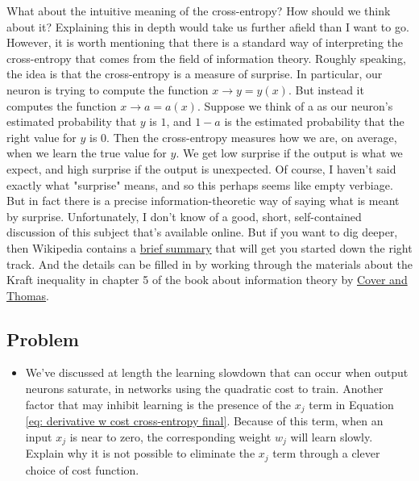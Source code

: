 \documentclass[a4paper,11pt,twoside]{report}
\begin{document}
What about the intuitive meaning of the cross-entropy? How should we think about it? Explaining this in depth would take us further afield than I want to go. However, it is worth mentioning that there is a standard way of interpreting the cross-entropy that comes from the field of information theory. Roughly speaking, the idea is that the cross-entropy is a measure of surprise. In particular, our neuron is trying to compute the function $x\rightarrow y=y(x)$. But instead it computes the function $x\rightarrow a=a(x)$. Suppose we think of a as our neuron's estimated probability that $y$ is $1$, and $1-a$ is the estimated probability that the right value for $y$ is $0$. Then the cross-entropy measures how  we are, on average, when we learn the true value for $y$. We get low surprise if the output is what we expect, and high surprise if the output is unexpected. Of course, I haven't said exactly what "surprise" means, and so this perhaps seems like empty verbiage. But in fact there is a precise information-theoretic way of saying what is meant by surprise. Unfortunately, I don't know of a good, short, self-contained discussion of this subject that's available online. But if you want to dig deeper, then Wikipedia contains a \href{https://en.wikipedia.org/wiki/Cross-entropy#Motivation}{brief summary} that will get you started down the right track. And the details can be filled in by working through the materials about the Kraft inequality in chapter 5 of the book about information theory by \href{https://books.google.ca/books?id=VWq5GG6ycxMC}{Cover and Thomas}.

\subsection*{Problem}
\label{Problem: impossibility of eleiminating presence of x_j}
\begin{itemize}
\item We've discussed at length the learning slowdown that can occur when output neurons saturate, in networks using the quadratic cost to train. Another factor that may inhibit learning is the presence of the $x_j$ term in Equation \ref{eq: derivative w cost cross-entropy final}. Because of this term, when an input $x_j$ is near to zero, the corresponding weight $w_j$ will learn slowly. Explain why it is not possible to eliminate the $x_j$ term through a clever choice of cost function.
\end{itemize}
\end{document}
